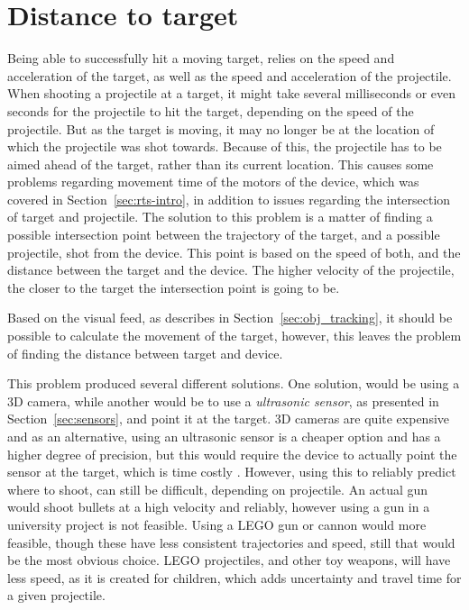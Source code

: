 \section{Distance to target}
Being able to successfully hit a moving target, relies on the speed and acceleration of the target, as well as the speed and acceleration of the projectile.
When shooting a projectile at a target, it might take several milliseconds or even seconds for the projectile to hit the target, depending on the speed of the projectile.
But as the target is moving, it may no longer be at the location of which the projectile was shot towards.
Because of this, the projectile has to be aimed ahead of the target, rather than its current location.
This causes some problems regarding movement time of the motors of the device, which was covered in Section~\ref{sec:rts-intro}, in addition to issues regarding the intersection of target and projectile.
The solution to this problem is a matter of finding a possible intersection point between the trajectory of the target, and a possible projectile, shot from the device. 
This point is based on the speed of both, and the distance between the target and the device. 
The higher velocity of the projectile, the closer to the target the intersection point is going to be.

Based on the visual feed, as describes in Section~\ref{sec:obj_tracking}, it should be possible to calculate the movement of the target, however, this leaves the problem of finding the distance between target and device.

This problem produced several different solutions.
One solution, would be using a 3D camera, while another would be to use a \textit{ultrasonic sensor}, as presented in Section~\ref{sec:sensors}, and point it at the target.
3D cameras are quite expensive and as an alternative, using an ultrasonic sensor is a cheaper option and has a higher degree of precision, but this would require the device to actually point the sensor at the target, which is time costly \cite{sensors}.
However, using this to reliably predict where to shoot, can still be difficult, depending on projectile.
An actual gun would shoot bullets at a high velocity and reliably, however using a gun in a university project is not feasible.
Using a LEGO gun or cannon would more feasible, though these have less consistent trajectories and speed, still that would be the most obvious choice.
LEGO projectiles, and other toy weapons, will have less speed, as it is created for children, which adds uncertainty and travel time for a given projectile.

